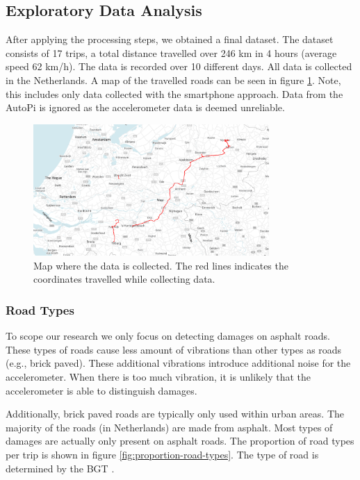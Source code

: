 \subsection{Exploratory Data Analysis}

After applying the processing steps, we obtained a final dataset. The dataset consists of 17 trips, a total distance travelled over 246 km in 4 hours (average speed 62 km/h). The data is recorded over 10 different days. All data is collected in the Netherlands. A map of the travelled roads can be seen in figure \ref{fig:gps-trips}. Note, this includes only data collected with the smartphone approach. Data from the AutoPi is ignored as the accelerometer data is deemed unreliable.

\begin{figure}[ht]
\centering
\includegraphics[width=0.8\textwidth,keepaspectratio]{images/4_data/gps-trips.png}
\captionsetup{width=.90\textwidth}
\caption{Map where the data is collected. The red lines indicates the coordinates travelled while collecting data.}
\label{fig:gps-trips}
\end{figure}

\subsubsection{Road Types}

To scope our research we only focus on detecting damages on asphalt roads. These types of roads cause less amount of vibrations than other types as roads (e.g., brick paved). These additional vibrations introduce additional noise for the accelerometer. When there is too much vibration, it is unlikely that the accelerometer is able to distinguish damages.

Additionally, brick paved roads are typically only used within urban areas. The majority of the roads (in Netherlands) are made from asphalt. Most types of damages are actually only present on asphalt roads. The proportion of road types per trip is shown in figure \ref{fig:proportion-road-types}. The type of road is determined by the BGT \cite{BGT}. 

